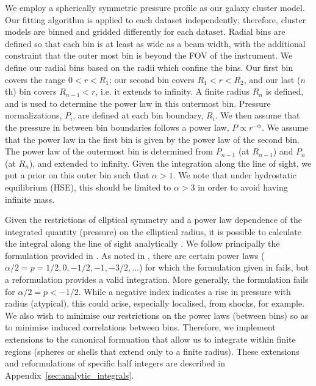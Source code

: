 \documentclass[twocolumn,traditabstract]{aa}
\begin{document}
We employ a spherically symmetric pressure profile as our galaxy cluster model. Our fitting algorithm is applied
to each dataset independently; therefore, cluster models are binned and gridded differently for each dataset.
Radial bins are defined so that
each bin is at least as wide as a beam width, with the additional constraint that the outer most bin is beyond
the FOV of the instrument. We define our radial bins based on the radii which confine the bins. Our first bin
covers the range $0 < r < R_1$; our second bin covers $R_1 < r < R_2$, and our last ($n$th) bin covers
$R_{n-1} < r $, i.e. it extends to infinity. A finite radius $R_n$ is defined, and is used to determine the power
law in this outermost bin. Pressure normalizations, $P_i$, are defined at each bin boundary, $R_i$. We then assume
that the pressure in between bin boundaries follows a power law, $P \propto r^{-\alpha}$. We assume that the power
law in the first bin is given by the power law of the second bin.
The power law of the outermost bin is determined from $P_{n-1}$ (at $R_{n-1}$) and $P_{n}$ (at $R_{n}$), and extended
to infinity. Given the integration along the line of sight, we put a prior on this outer bin such that $\alpha > 1$.
We note that under hydrostatic equilibrium (HSE), this should be limited to $\alpha >3$ in order to avoid having
infinite mass.

Given the restrictions of ellptical symmetry and a power law dependence of the integrated quantity (pressure) on the
elliptical radius, it is possible to calculate the integral along the line of sight analytically
\citep[e.g.][]{vikhlinin2001a,korngut2011}. We follow
principally the formulation provided in \citet{korngut2011}. As noted in \citet{sarazin2016}, there are certain power
laws ($\alpha/2 = p = 1/2, 0 , -1/2, -1, -3/2, ...$) for which the formulation given in \citet{korngut2011} fails,
but a reformulation provides a valid integration. More generally, the formulation fails for $\alpha/2 = p < -1/2$.
While a negative index indicates a rise in pressure with radius (atypical), this could arise, especially localised,
from shocks, for example. We also wish to minimise our restrictions on the power laws (between bins) so as to minimise
induced correlations between bins. Therefore, we implement extensions to the canonical formuation that allow us to
integrate within finite regions (spheres or shells that extend only to a finite radius). These extensions and
reformulations of specific half integers are described in Appendix~\ref{sec:analytic_integrals}.
\end{document}

